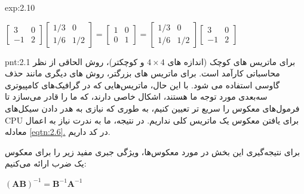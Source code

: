 {\begin{spacing}{1.5}
\begin{example}{exp:2.10}
            \begin{center}
                $\begin{bmatrix}
                     3  & 0 \\
                     -1 & 2
                \end{bmatrix}\begin{bmatrix}
                                 1/3 & 0   \\
                                 1/6 & 1/2
                \end{bmatrix}=\begin{bmatrix}
                                  1 & 0 \\
                                  0 & 1
                \end{bmatrix}=\begin{bmatrix}
                                  1/3 & 0   \\
                                  1/6 & 1/2
                \end{bmatrix}\begin{bmatrix}
                                 3  & 0 \\
                                 -1 & 2
                \end{bmatrix}$
            \end{center}
        \end{example}

        \begin{point}{pnt:2.1}
            \Large
            برای ماتریس های کوچک (اندازه های $4\times 4$ و کوچکتر)، روش الحاقی از نظر محاسباتی کارآمد است.
            برای ماتریس های بزرگتر، روش های دیگری مانند حذف گاوسی استفاده می شود.
            با این حال، ماتریس‌هایی که در گرافیک‌های کامپیوتری سه‌بعدی مورد توجه ما هستند،
            اشکال خاصی دارند، که ما را قادر می‌سازد تا فرمول‌های معکوس را سریع تر تعیین کنیم،
            به طوری که نیازی به هدر دادن سیکل‌های CPU برای یافتن معکوس یک ماتریس کلی نداریم.
            در نتیجه، ما به ندرت نیاز به اعمال معادله \hyperref[eqtn:2.6]{\ref{eqtn:2.6}.} در کد داریم.
        \end{point}

        برای نتیجه‌گیری این بخش در مورد معکوس‌ها، ویژگی جبری مفید زیر را برای معکوس یک ضرب ارائه می‌کنیم:

        \begin{center}
            $(\textbf{AB})^{-1}=\textbf{B}^{-1}\textbf{A}^{-1}$
        \end{center}


\end{spacing}}
